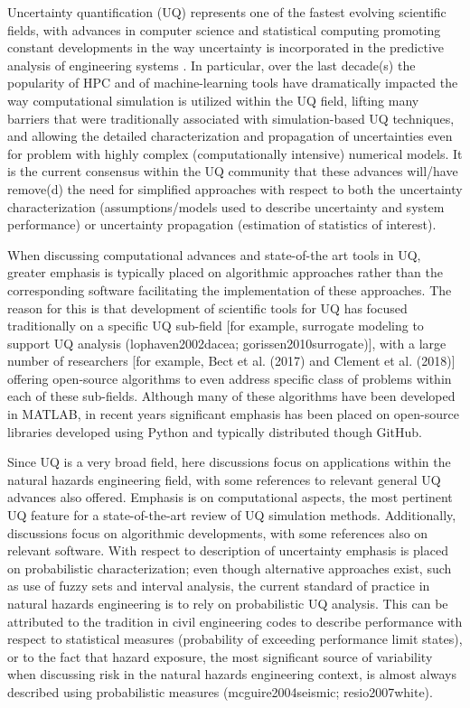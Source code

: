 Uncertainty quantification (UQ) represents one of the fastest evolving scientific fields, with advances in computer science and statistical computing promoting constant developments in the way uncertainty is incorporated in the predictive analysis of engineering systems \citep{smith2013uncertainty}. In particular, over the last decade(s) the popularity of HPC and of machine-learning tools have dramatically impacted the way computational simulation is utilized within the UQ field, lifting many barriers that were traditionally associated with simulation-based UQ techniques, and allowing the detailed characterization and propagation of uncertainties even for problem with highly complex (computationally intensive) numerical models. It is the current consensus within the UQ community that these advances will/have remove(d) the need for simplified approaches with respect to both the uncertainty characterization (assumptions/models used to describe uncertainty and system performance) or uncertainty propagation (estimation of statistics of interest). 

When discussing computational advances and state-of-the art tools in UQ, greater emphasis is typically placed on algorithmic approaches rather than the corresponding software facilitating the implementation of these approaches. The reason for this is that development of scientific tools for UQ has focused traditionally on a specific UQ sub-field [for example, surrogate modeling to support UQ analysis (lophaven2002dacea; gorissen2010surrogate)], with a large number of researchers [for example, Bect et al. (2017) and Clement et al. (2018)] offering open-source algorithms to even address specific class of problems within each of these sub-fields. Although many of these algorithms have been developed in MATLAB, in recent years significant emphasis has been placed on open-source libraries developed using Python and typically distributed though GitHub. 

Since UQ is a very broad field, here discussions focus on applications within the natural hazards engineering field, with some references to relevant general UQ advances also offered. Emphasis is on computational aspects, the most pertinent UQ feature for a state-of-the-art review of UQ simulation methods. Additionally, discussions focus on algorithmic developments, with some references also on relevant software. With respect to description of uncertainty emphasis is placed on probabilistic characterization; even though alternative approaches exist, such as use of fuzzy sets and interval analysis, the current standard of practice in natural hazards engineering is to rely on probabilistic UQ analysis. This can be attributed to the tradition in civil engineering codes to describe performance with respect to statistical measures (probability of exceeding performance limit states), or to the fact that hazard exposure, the most significant source of variability when discussing risk in the natural hazards engineering context, is almost always described using probabilistic measures (mcguire2004seismic; resio2007white). 

